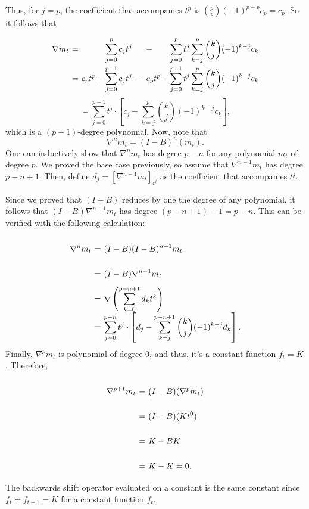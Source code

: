 Thus, for $j = p$, the coefficient that accompanies $t^p$ is $\binom{p}{p}(-1)^{p-p} c_p = c_p$. So it follows that
\[ \everymath{\displaystyle}
\arraycolsep=1.8pt\def\arraystretch{2.5}
\begin{array}{rcllll}
    \nabla m_t & = &  & \sum_{j = 0}^{p}c_j t^{j}  & - & \sum_{j = 0}^{p} t^j \sum_{k = j}^{p} \binom{k}{j} (-1)^{k-j} c_k\\
    & = & c_p t^p + & \sum_{j = 0}^{p-1}c_j t^{j} \; - \; & c_p t^p - & \sum_{j = 0}^{p-1} t^j \sum_{k = j}^{p} \binom{k}{j} (-1)^{k-j} c_k\\
\end{array}  \]
\[ = \sum_{j = 0}^{p-1} t^j \cdot \left[ c_j - \sum_{k = j}^{p} \binom{k}{j} (-1)^{k-j} c_k \right], \]
which is a $(p-1)$-degree polynomial. Now, note that
\[ \nabla^{n} m_{t} = (I-B)^{n}(m_t). \]
One can inductively show that $\nabla^n m_t$ has degree $p-n$ for any polynomial $m_t$ of degree $p$. We proved the base case previously, so assume that $\nabla^{n-1} m_t$ has degree $p-n+1$. Then, define $d_j = [\nabla^{n-1} m_t]_{t^j}$ as the coefficient that accompanies $t^j$. 

Since we proved that $(I-B)$ reduces by one the degree of any polynomial, it follows that $(I-B) \nabla^{n-1} m_t$ has degree $(p-n+1)-1 = p-n$. This can be verified with the following calculation:
\[ \everymath{\displaystyle}
\arraycolsep=1.8pt\def\arraystretch{2.5}
\begin{array}{rcl}
    \nabla^{n} m_t & = & (I-B) (I-B)^{n-1} m_t\\
    & = & (I-B) \nabla^{n-1} m_t\\
    & = & \nabla \left( \sum_{k = 0}^{p-n+1} d_k t^k \right)\\
    & = & \sum_{j = 0}^{p-n} t^j \cdot \left[ d_j - \sum_{k = j}^{p-n+1} \binom{k}{j} (-1)^{k-j} d_k \right].
\end{array} \] 
Finally, $\nabla^{p}m_t$ is polynomial of degree 0, and thus, it's a constant function $f_t = K$. Therefore,
\[ \everymath{\displaystyle}
\arraycolsep=1.8pt\def\arraystretch{2.5}
\begin{array}{rcl}
    \nabla^{p+1} m_t & = & (I-B) (\nabla^{p}m_t)\\
    & = & (I-B) (Kt^0)\\
    & = & K - BK\\
    & = & K - K = 0.
\end{array} \]
The backwards shift operator evaluated on a constant is the same constant since $f_t = f_{t-1} = K$ for a constant function $f_t$.